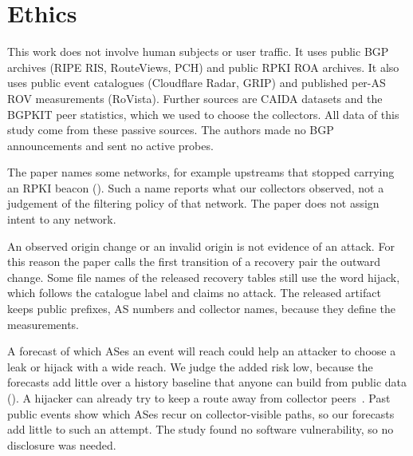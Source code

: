 \section{Ethics}\label{sec:ethics}
This work does not involve human subjects or user traffic.
It uses public BGP archives (RIPE RIS, RouteViews, PCH) and public RPKI ROA archives.
It also uses public event catalogues (Cloudflare Radar, GRIP) and published per-AS ROV measurements (RoVista).
Further sources are CAIDA datasets and the BGPKIT peer statistics, which we used to choose the collectors.
All data of this study come from these passive sources.
The authors made no BGP announcements and sent no active probes.

The paper names some networks, for example upstreams that stopped carrying an RPKI beacon ().
Such a name reports what our collectors observed, not a judgement of the filtering policy of that network.
The paper does not assign intent to any network.

An observed origin change or an invalid origin is not evidence of an attack.
For this reason the paper calls the first transition of a recovery pair the outward change.
Some file names of the released recovery tables still use the word hijack, which follows the catalogue label and claims no attack.
The released artifact keeps public prefixes, AS numbers and collector names, because they define the measurements.

A forecast of which ASes an event will reach could help an attacker to choose a leak or hijack with a wide reach.
We judge the added risk low, because the forecasts add little over a history baseline that anyone can build from public data ().
A hijacker can already try to keep a route away from collector peers~\cite{milolidakis2023}.
Past public events show which ASes recur on collector-visible paths, so our forecasts add little to such an attempt.
The study found no software vulnerability, so no disclosure was needed.

